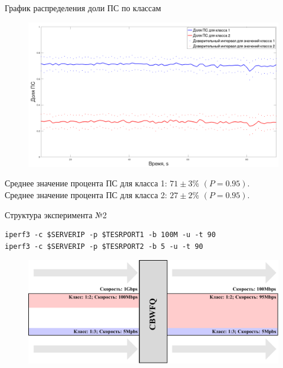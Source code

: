 \documentclass[12pt]{beamer}
\begin{document}
\begin{frame}{График распределения доли ПС по классам}
	\begin{figure}[t]
		\center
    	\includegraphics[scale=0.255]{./plotc.png}

	\end{figure}
	\begin{center}{\footnotesize
	 Среднее значение процента ПС для класса 1: $71 \pm 3 \%$ $(P = 0.95)$.\\
     Среднее значение процента ПС для класса 2: $27 \pm 2 \%$ $(P = 0.95)$.\\
	}
	\end{center}
\end{frame}

\begin{frame}[fragile]{Структура эксперимента №2}

{\footnotesize%
	\begin{lstlisting}[frame=single,emph={iperf3},emphstyle={\bfseries}]
iperf3 -c $SERVERIP -p $TESRPORT1 -b 100M -u -t 90
iperf3 -c $SERVERIP -p $TESRPORT2 -b 5 -u -t 90
    \end{lstlisting}%
}%

	\begin{figure}
		\center
    	\includegraphics[scale=0.65]{../text/pdfimages/exp_scheme2.pdf}
	\end{figure}
\end{frame}
\end{document}
